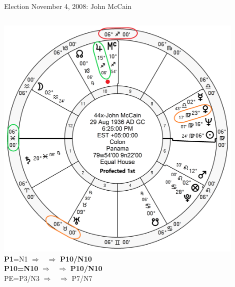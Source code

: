 \begin{frame}[t]{Election November 4, 2008: John McCain}
\begin{columns}[T, onlytextwidth]
\vspace{-1em}
{\includegraphics[width=0.9\textwidth]{charts/McCain-Prof-1st.png}}
\fontsize{8pt}{9pt}\selectfont
\textbf{\dgreen P1}=N1
	$\Rightarrow$ \Jupiter\, $\Rightarrow$ \textbf{\red P10/N10}\\
\textbf{\red P10=N10}
	$\Rightarrow$ \Jupiter\, $\Rightarrow$ \textbf{\red P10/N10}\\
PE=P3/N3
	 $\Rightarrow$ \Venus\, $\Rightarrow$ P7/N7

\end{columns}
\end{frame}
